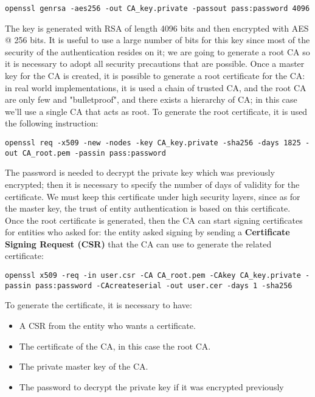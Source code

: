 \documentclass{article}
\begin{document}
\begin{lstlisting}[breaklines]
openssl genrsa -aes256 -out CA_key.private -passout pass:password 4096
\end{lstlisting}

The key is generated with RSA of length 4096 bits and then encrypted with AES @ 256 bits. It is useful to use a large number of bits for this key since most of the security of the authentication resides on it; we are going to generate a root CA so it is necessary to adopt all security precautions that are possible. Once a master key for the CA is created, it is possible to generate a root certificate for the CA: in real world implementations, it is used a chain of trusted CA, and the root CA are only few and "bulletproof", and there exists a hierarchy of CA; in this case we'll use a single CA that acts as root. To generate the root certificate, it is used the following instruction:  

\begin{lstlisting}[breaklines]
openssl req -x509 -new -nodes -key CA_key.private -sha256 -days 1825 -out CA_root.pem -passin pass:password
\end{lstlisting}

The password is needed to decrypt the private key which was previously encrypted; then it is necessary to specify the number of days of validity for the certificate. We must keep this certificate under high security layers, since as for the master key, the trust of entity authentication is based on this certificate. Once the root certificate is generated, then the CA can start signing certificates for entities who asked for: the entity asked signing by sending a \textbf{Certificate Signing Request (CSR)} that the CA can use to generate the related certificate:

\begin{lstlisting}[breaklines]
openssl x509 -req -in user.csr -CA CA_root.pem -CAkey CA_key.private -passin pass:password -CAcreateserial -out user.cer -days 1 -sha256
\end{lstlisting}

To generate the certificate, it is necessary to have: 

\begin{itemize}
	\item A CSR from the entity who wants a certificate.
	\item The certificate of the CA, in this case the root CA.
	\item The private master key of the CA.
	\item The password to decrypt the private key if it was encrypted previously
\end{itemize}
\end{document}
